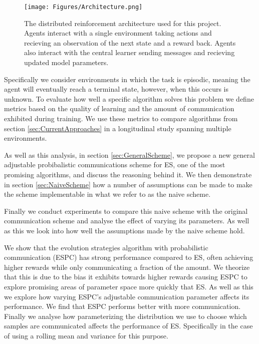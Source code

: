 \begin{figure}
    \centering
    \texttt{[image: Figures/Architecture.png]}
    \caption{The distributed reinforcement architecture used for this project. Agents interact with a single environment taking actions and recieving an observation of the next state and a reward back. Agents also interact with the central learner sending messages and recieving updated model parameters.}
    \label{fig:Architecture}
\end{figure}
Specifically we consider environments in which the task is episodic, meaning the agent will eventually reach a terminal state, however, when this occurs is unknown.
To evaluate how well a specific algorithm solves this problem we define metrics based on the quality of learning and the amount of communication exhibited during training.
We use these metrics to compare algorithms from section \ref{sec:CurrentApproaches} in a longitudinal study spanning multiple environments. 

As well as this analysis, in section \ref{sec:GeneralScheme}, we propose a new general adjustable probibalistic communications scheme for ES, one of the most promising algorithms, and discuss the reasoning behind it. We then demonstrate in section \ref{sec:NaiveScheme} how a number of assumptions can be made to make the scheme implementable in what we refer to as the naive scheme.

Finally we conduct experiments to compare this naive scheme with the original communication scheme and analyse the effect of varying its parameters. As well as this we look into how well the assumptions made by the naive scheme hold.

We show that the evolution strategies algorithm with probabilistic communication (ESPC) has strong performance compared to ES, often achieving higher rewards while only communicating a fraction of the amount. We theorize that this is due to the bias it exhibits towards higher rewards causing ESPC to explore promising areas of parameter space more quickly that ES.
As well as this we explore how varying ESPC's adjustable communication parameter affects its performance. We find that ESPC performs better with more communication. Finally we analyse how parameterizing the distribution we use to choose which samples are communicated affects the performance of ES. Specifically in the case of using a rolling mean and variance for this purpose.
